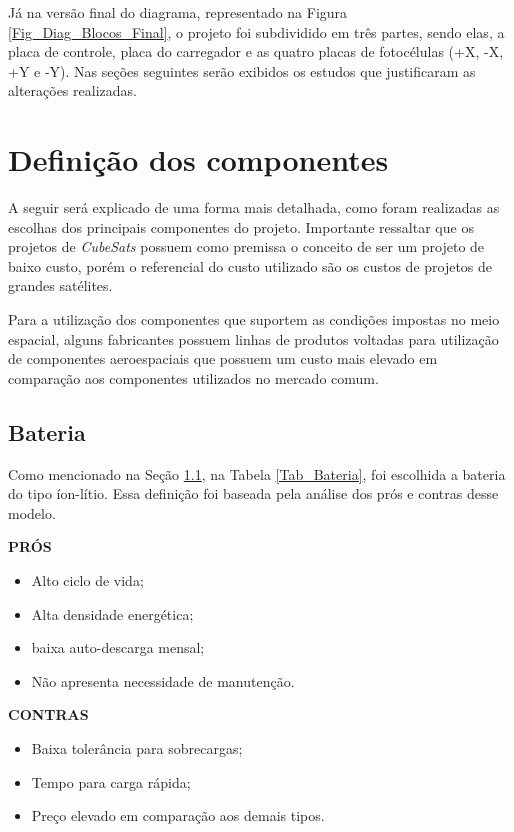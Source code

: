 \documentclass[
	12pt,				%
	openright,			%
	oneside,			%
	a4paper,			%
	english,			%
	french,				%
	spanish,			%
	brazil,				%
	oldfontcommands
	]{abntex2}
\begin{document}
	Já na versão final do diagrama, representado na Figura \ref{Fig_Diag_Blocos_Final}, o projeto foi subdividido em três partes, sendo elas, a placa de controle, placa do carregador e as quatro placas de fotocélulas (+X, -X, +Y e -Y). Nas seções seguintes serão exibidos os estudos que justificaram as alterações realizadas.
 
\section[Definição dos componentes]{Definição dos componentes}

	A seguir será explicado de uma forma mais detalhada, como foram realizadas as escolhas dos principais componentes do projeto. Importante ressaltar que os projetos de \textit{CubeSats} possuem como premissa o conceito de ser um projeto de baixo custo, porém o referencial do custo utilizado são os custos de projetos de grandes satélites.
	
	Para a utilização dos componentes que suportem as condições impostas  no meio espacial, alguns fabricantes possuem linhas de produtos voltadas para utilização de componentes aeroespaciais que possuem um custo mais elevado em comparação aos componentes utilizados no mercado comum.

\subsection[Bateria]{Bateria} \label{Sec_Bateria}

	Como mencionado na Seção \ref{Sec_Bateria}, na Tabela \ref{Tab_Bateria}, foi escolhida a bateria do tipo íon-lítio. Essa definição foi baseada pela análise dos prós e contras desse modelo.
	
	\begin{minipage}{6cm}
		\begin{center}
			\textbf{PRÓS}
		\end{center}
		
		\begin{itemize}
			\item Alto ciclo de vida;
			\item Alta densidade energética;
			\item baixa auto-descarga mensal;
			\item Não apresenta necessidade de manutenção.
		\end{itemize}
	
	\end{minipage}
	\begin{minipage}{7cm}
		\begin{center}
			\textbf{CONTRAS}
		\end{center}
		
		\begin{itemize}
			\item Baixa tolerância para sobrecargas;
			\item Tempo para carga rápida;
			\item Preço elevado em comparação aos demais tipos.
		\end{itemize}
		
	\end{minipage}
		
\end{document}

